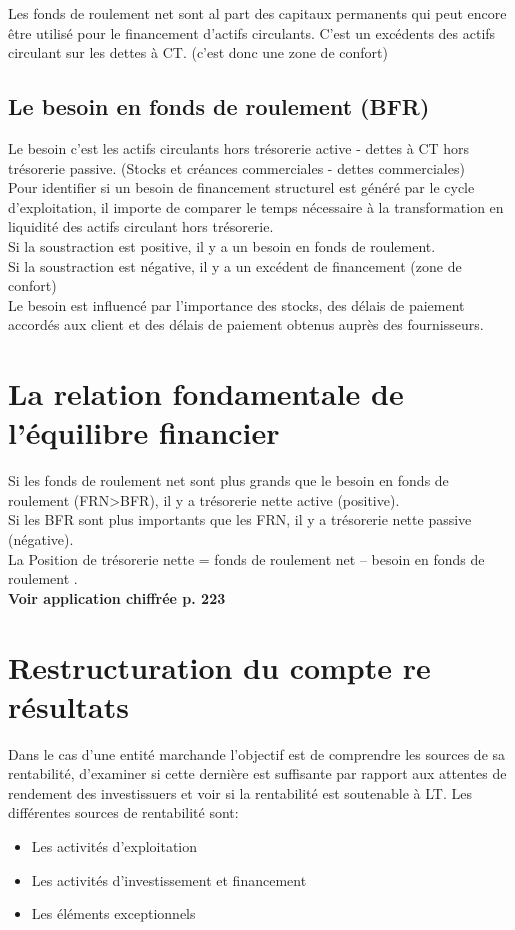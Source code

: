 \documentclass{article}
\begin{document}
Les fonds de roulement net sont al part des capitaux permanents qui peut encore être utilisé pour le financement d'actifs circulants. C'est un excédents des actifs circulant sur les dettes à CT. (c'est donc une zone de confort) \\

\subsection{Le besoin en fonds de roulement (BFR)}
Le besoin c'est les actifs circulants hors trésorerie active - dettes à CT hors trésorerie passive. (Stocks et créances commerciales - dettes commerciales) \\
Pour identifier si un besoin de financement structurel est généré par le cycle d'exploitation, il importe de comparer le temps nécessaire à la transformation en liquidité des actifs circulant hors trésorerie.  \\
Si la soustraction est positive, il y a un besoin en fonds de roulement. \\
Si la soustraction est négative, il y a un excédent de financement (zone de confort) \\
Le besoin est influencé par l'importance des stocks, des délais de paiement accordés aux client et des délais de paiement obtenus auprès des fournisseurs.

\section{La relation fondamentale de l'équilibre financier}
Si les fonds de roulement net sont plus grands que le besoin en fonds de roulement (FRN>BFR), il y a trésorerie nette active (positive). \\
Si les BFR sont plus importants que les FRN, il y a trésorerie nette passive (négative). \\
La Position de trésorerie nette = fonds de roulement net – besoin en fonds de roulement . \\
\textbf{Voir application chiffrée p. 223}

\section{Restructuration du compte re résultats}
Dans le cas d'une entité marchande l'objectif est de comprendre les sources de sa rentabilité, d'examiner si cette dernière est suffisante par rapport aux attentes de rendement des investissuers et voir si la rentabilité est soutenable à LT.
Les différentes sources de rentabilité sont: 
\begin{itemize}
    \item Les activités d'exploitation
    \item Les activités d'investissement et financement
    \item Les éléments exceptionnels
\end{itemize}
\end{document}
